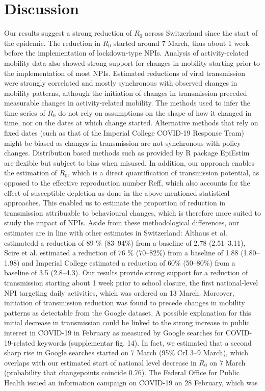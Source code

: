 \section{Discussion}
Our results suggest a strong reduction of $R_0$ across Switzerland since the start of the epidemic. The reduction in $R_0$ started around 7 March, thus about 1 week before the implementation of lockdown-type NPIs. Analysis of activity-related mobility data also showed strong support for changes in mobility starting prior to the implementation of most NPIs. Estimated reductions of viral transmission were strongly correlated and mostly synchronous with observed changes in mobility patterns, although the initiation of changes in transmission preceded measurable changes in activity-related mobility. The methods used to infer the time series of $R_0$ do not rely on assumptions on the shape of how it changed in time, nor on the dates at which change started. Alternative methods that rely on fixed dates (such as that of the Imperial College COVID-19 Response Team\cite{Flaxman:Report13Estimating:2020}) might be biased as changes in transmission are not synchronous with policy changes. Distribution based methods such as provided by R package EpiEstim\cite{Wallinga:DifferentEpidemicCurves:2004,Cori:NewFrameworkSoftware:2013} are flexible but subject to bias when misused\cite{Lipsitch:CommentPanLiu:2020}. In addition, our approach enables the estimation of $R_0$, which is a direct quantification of transmission potential, as opposed to the effective reproduction number Reff, which also accounts for the effect of susceptible depletion as done in the above-mentioned statistical approaches. This enabled us to estimate the proportion of reduction in transmission attribuable to behavioural changes, which is therefore more suited to study the impact of NPIs. Aside from these methodological differences, our estimates are in line with other estimates in Switzerland: Althaus et al.\cite{Althaus:RealtimeModelingProjections:2020} estimatedd a reduction of 89 \% (83–94\%) from a baseline of 2.78 (2.51–3.11), Scire et al.\cite{Scire:ReproductiveNumberCOVID19:2020} estimated a reduction of 76 \% (70–82\%) from a baseline of 1.88 (1.80–1.98) and Imperial College estimated a reduction of 60\% (50–80\%) from a baseline of 3.5 (2.8–4.3)\cite{Flaxman:Report13Estimating:2020}. Our results provide strong support for a reduction of transmission starting about 1 week prior to school closure, the first national-level NPI targeting daily activities, which was ordered on 13 March. Moreover, initiation of transmission reduction was found to precede changes in mobility patterns as detectable from the Google dataset. A possible explanation for this initial decrease in transmission could be linked to the strong increase in public interest in COVID-19 in February as measured by Google searches for COVID-19-related keywords (supplementar fig. 14). In fact, we estimated that a second sharp rise in Google searches started on 7 March (95\% CrI 3–9 March), which overlaps with our estimated start of national level decrease in $R_0$ on 7 March (probability that changepoints coincide 0.76). The Federal Office for Public Health issued an information campaign on COVID-19 on 28 February, which was 